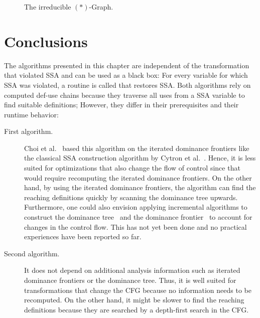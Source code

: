 {\begin{figure}
    \hfil{}\hfil\strut
    \caption{The irreducible $(\ast)$-Graph.}
    \label{fig:astgraph}
\end{figure}


\section{Conclusions}


The algorithms presented in this chapter are independent of the transformation that violated SSA and can be used as a black box:
For every variable for which SSA was violated, a routine is called that restores SSA.
Both algorithms rely on computed def-use chains because they traverse all uses from a SSA variable to find suitable definitions;
However, they differ in their prerequisites and their runtime behavior:
\begin{description}
	\item[First algorithm.]
		Choi et al.~\cite{Choi:1996ji} based this algorithm on the iterated dominance frontiers like the classical SSA construction algorithm by Cytron et al.~\cite{cytron:1991:ssa}.
		Hence, it is less suited for optimizations that also change the flow of control since that would require recomputing the iterated dominance frontiers.
		On the other hand, by using the iterated dominance frontiers, the algorithm can find the reaching definitions quickly by scanning the dominance tree upwards.
		Furthermore, one could also envision applying incremental algorithms to construct the dominance tree~\cite{Ramalingam:1994iq,Sreedhar:1995:ICD:202529.202531} and the dominance frontier~\cite{Sreedhar:1996:NFE:231379.231434} to account for changes in the control flow. 
		This has not yet been done and no practical experiences have been reported so far.

	\item[Second algorithm.] 
		It does not depend on additional analysis information such as iterated dominance frontiers or the dominance tree.
		Thus, it is well suited for transformations that change the CFG because no information needs to be recomputed.
		On the other hand, it might be slower to find the reaching definitions because they are searched by a depth-first search in the CFG.
\end{description}

}
